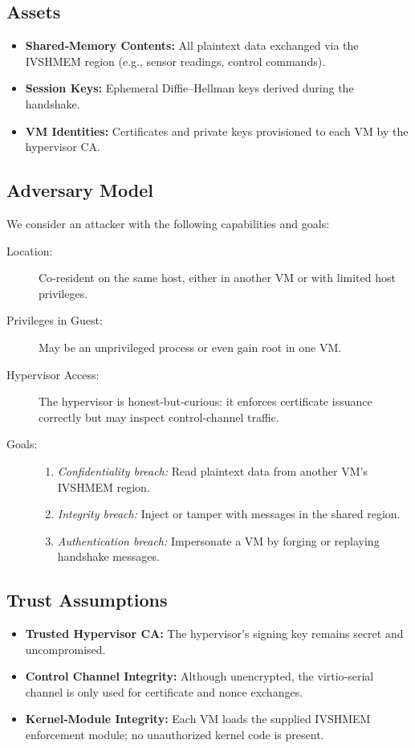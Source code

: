 \documentclass[conference]{IEEEtran}
\begin{document}
\subsection{Assets}
\begin{itemize}
  \item \textbf{Shared‐Memory Contents:} All plaintext data exchanged via the IVSHMEM region (e.g., sensor readings, control commands).
  \item \textbf{Session Keys:} Ephemeral Diffie–Hellman keys derived during the handshake.
  \item \textbf{VM Identities:} Certificates and private keys provisioned to each VM by the hypervisor CA.
\end{itemize}

\subsection{Adversary Model}
We consider an attacker with the following capabilities and goals:
\begin{description}
  \item[Location:] Co‐resident on the same host, either in another VM or with limited host privileges.
  \item[Privileges in Guest:] May be an unprivileged process or even gain root in one VM.
  \item[Hypervisor Access:] The hypervisor is honest‐but‐curious: it enforces certificate issuance correctly but may inspect control‐channel traffic.
  \item[Goals:]
    \begin{enumerate}
      \item \emph{Confidentiality breach:} Read plaintext data from another VM’s IVSHMEM region.
      \item \emph{Integrity breach:} Inject or tamper with messages in the shared region.
      \item \emph{Authentication breach:} Impersonate a VM by forging or replaying handshake messages.
    \end{enumerate}
\end{description}

\subsection{Trust Assumptions}
\begin{itemize}
  \item \textbf{Trusted Hypervisor CA:} The hypervisor’s signing key remains secret and uncompromised.
  \item \textbf{Control Channel Integrity:} Although unencrypted, the virtio‐serial channel is only used for certificate and nonce exchanges.
  \item \textbf{Kernel‐Module Integrity:} Each VM loads the supplied IVSHMEM enforcement module; no unauthorized kernel code is present.
\end{itemize}
\end{document}
